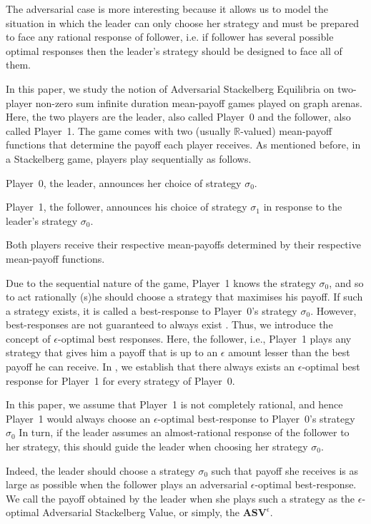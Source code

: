The adversarial case is more interesting because it allows us to model the situation in which the leader can only choose her strategy and must be prepared to face any rational response of follower, i.e. if follower has several possible optimal responses then the leader's strategy should be designed to face all of them.

In this paper, we study the notion of Adversarial Stackelberg Equilibria on two-player non-zero sum infinite duration mean-payoff games played on graph arenas. Here, the two players are the leader, also called Player~0 and the follower, also called Player~1. The game comes with two (usually $\mathbb{R}$-valued) mean-payoff functions that determine the payoff each player receives. As mentioned before, in a Stackelberg game, players play sequentially as follows.
\begin{inparaenum}[(i)]
\item Player~0, the leader, announces her choice of strategy $\sigma_0$. 
\item Player~1, the follower, announces his choice of strategy $\sigma_1$ in response to the leader's strategy $\sigma_0$. 
\item Both players receive their respective mean-payoffs determined by their respective mean-payoff functions.
\end{inparaenum}
Due to the sequential nature of the game, Player~1 knows the strategy $\sigma_0$, and so to act rationally (s)he should choose a strategy that maximises his payoff. If such a strategy exists, it is called a best-response to Player~0's strategy $\sigma_0$. However, best-responses are not guaranteed to always exist \cite{FGR20}. Thus, we introduce the concept of $\epsilon$-optimal best responses. Here, the follower, i.e., Player~1  plays any strategy that gives him a payoff that is up to an $\epsilon$ amount lesser than the best payoff he can receive. In \cite{FGR20}, we establish that there always exists an $\epsilon$-optimal best response for Player~1 for every strategy of Player~0. 

In this paper, we assume that Player~1 is not completely rational, and hence Player~1 would always choose an $\epsilon$-optimal best-response to Player~0's strategy $\sigma_0$
In turn, if the leader assumes an almost-rational response of the follower to her strategy, this should guide the leader when choosing her strategy $\sigma_0$.

Indeed, the leader should choose a strategy $\sigma_0 $ such that payoff she receives is as large as possible when the follower plays an adversarial $\epsilon$-optimal best-response. We call the payoff obtained by the leader when she plays such a strategy as the $\epsilon$-optimal Adversarial Stackelberg Value, or simply, the $\mathbf{ASV}^{\epsilon}$.

